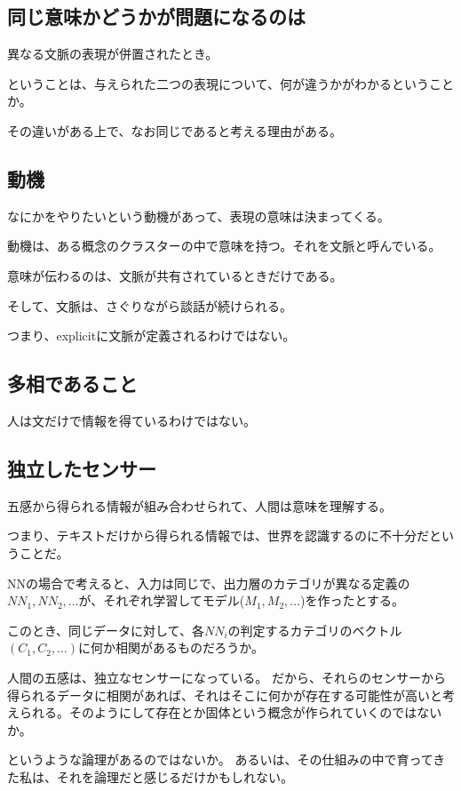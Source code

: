 \documentclass[10pt, oneside]{jarticle}   	%
\begin{document}
\subsection{同じ意味かどうかが問題になるのは}
異なる文脈の表現が併置されたとき。

ということは、与えられた二つの表現について、何が違うかがわかるということか。

その違いがある上で、なお同じであると考える理由がある。

\subsection{動機}
なにかをやりたいという動機があって、表現の意味は決まってくる。

動機は、ある概念のクラスターの中で意味を持つ。それを文脈と呼んでいる。

意味が伝わるのは、文脈が共有されているときだけである。

そして、文脈は、さぐりながら談話が続けられる。

つまり、explicitに文脈が定義されるわけではない。

\subsection{多相であること}
人は文だけで情報を得ているわけではない。

\subsection{独立したセンサー}
五感から得られる情報が組み合わせられて、人間は意味を理解する。

つまり、テキストだけから得られる情報では、世界を認識するのに不十分だということだ。

NNの場合で考えると、入力は同じで、出力層のカテゴリが異なる定義の$NN_1, NN_2, \dots$が、それぞれ学習してモデル($M_1, M_2, \dots$)を作ったとする。

このとき、同じデータに対して、各$NN_i$の判定するカテゴリのベクトル$(C_1,C_2,\dots)$に何か相関があるものだろうか。

人間の五感は、独立なセンサーになっている。
だから、それらのセンサーから得られるデータに相関があれば、それはそこに何かが存在する可能性が高いと考えられる。そのようにして存在とか固体という概念が作られていくのではないか。

というような論理があるのではないか。
あるいは、その仕組みの中で育ってきた私は、それを論理だと感じるだけかもしれない。
\end{document}
